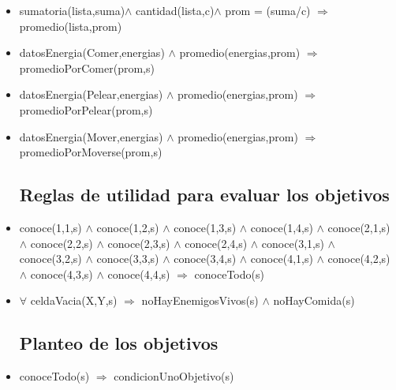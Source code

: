 \begin{itemize}
\item sumatoria(lista,suma)$\land$ cantidad(lista,c)$\land$ prom = (suma/c)
\newline
       $\Rightarrow$ promedio(lista,prom)

\item  datosEnergia(Comer,energias) $\land$ 
 promedio(energias,prom) $\Rightarrow$
 promedioPorComer(prom,s)
       
\item  datosEnergia(Pelear,energias) $\land$ 
 promedio(energias,prom) $\Rightarrow$
 promedioPorPelear(prom,s)

\item  datosEnergia(Mover,energias) $\land$ 
 promedio(energias,prom) $\Rightarrow$
 promedioPorMoverse(prom,s)

\subsection{Reglas de utilidad para evaluar los objetivos}

\item conoce(1,1,s) $\land$ conoce(1,2,s) $\land$ 
 conoce(1,3,s) $\land$ conoce(1,4,s) $\land$ 
 \newline 
 conoce(2,1,s) $\land$ conoce(2,2,s) $\land$ 
 conoce(2,3,s) $\land$ conoce(2,4,s) $\land$ 
 \newline 
 conoce(3,1,s) $\land$ conoce(3,2,s) $\land$ 
 conoce(3,3,s) $\land$ conoce(3,4,s) $\land$ 
 \newline 
 conoce(4,1,s) $\land$ conoce(4,2,s) $\land$ 
 conoce(4,3,s) $\land$ conoce(4,4,s) 
 \newline
 $\Rightarrow$ conoceTodo(s)
 
\item $\forall$ celdaVacia(X,Y,s) 
 $\Rightarrow$ noHayEnemigosVivos(s) $\land$ noHayComida(s)

\subsection{Planteo de los objetivos}
\item conoceTodo(s) $\Rightarrow$ condicionUnoObjetivo(s)


\end{itemize}
